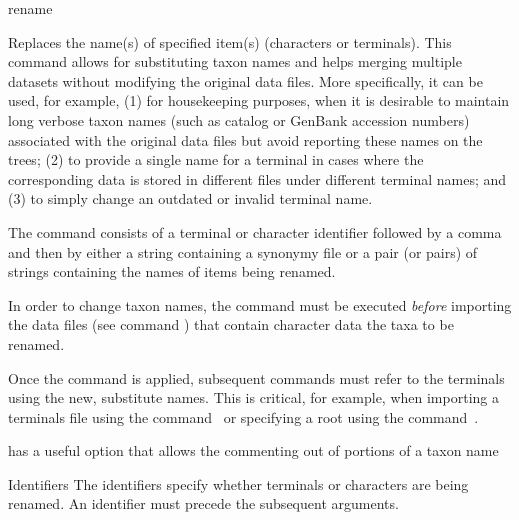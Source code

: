 \begin{command}{rename}{}

	
	\begin{poydescription} 
        Replaces the name(s) of specified item(s) (characters or terminals). This command allows 
        for substituting taxon names and helps merging multiple datasets without modifying the original
        data files. More specifically, it can be used, for example, (1) for housekeeping purposes,
        when it is desirable to maintain long verbose taxon names (such as catalog or GenBank
        accession numbers) associated with the original data files but avoid reporting these 
        names on the trees; (2) to provide a single name for a terminal in cases where the corresponding
        data is stored in different files under different terminal names; and (3) to simply change an
        outdated or invalid terminal name.
        
        The command consists of a terminal or character identifier followed by a comma and then by
        either a string containing a synonymy file or a pair (or pairs) of strings containing the names of
        items being renamed.
	\end{poydescription}  
	      
	\begin{statement}
        In order to change taxon names, the command  must be
        executed \emph{before} importing the data files (see command )
        that contain character data the taxa to be renamed.
    \end{statement}
          
    \begin{statement}
        Once the command  is applied, subsequent commands 
        must refer to the terminals using the new, substitute names. This is critical, for example,
        when importing a terminals file using the command~ or specifying
        a root using the command~.
    \end{statement}
          
    \begin{statement}
        \poy has a useful option that allows the commenting out of portions of a taxon name
    \end{statement}
          
    \begin{arguments}
		\begin{argumentgroup}{Identifiers}
		{The identifiers specify whether terminals or characters are being
        renamed. An identifier must precede the subsequent arguments.}
		

\end{argumentgroup}
\end{arguments}
\end{command}
